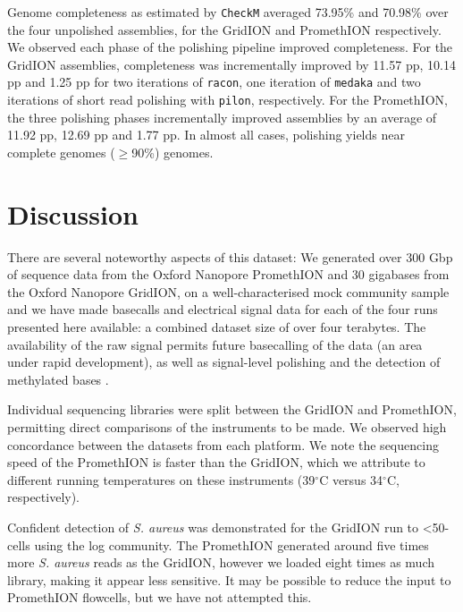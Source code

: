 \documentclass[a4paper,num-refs]{oup-contemporary}
\begin{document}
Genome completeness as estimated by \texttt{CheckM} averaged 73.95\% and 70.98\% over the four unpolished assemblies, for the GridION and PromethION respectively.
We observed each phase of the polishing pipeline improved completeness.
For the GridION assemblies, completeness was incrementally improved by 11.57 pp, 10.14 pp and 1.25 pp for two iterations of \texttt{racon}, one iteration of \texttt{medaka} and two iterations of short read polishing with \texttt{pilon}, respectively.
For the PromethION, the three polishing phases incrementally improved assemblies by an average of 11.92 pp, 12.69 pp and 1.77 pp.
In almost all cases, polishing yields near complete genomes ($\geq$90\%) genomes.








\section{Discussion}

There are several noteworthy aspects of this dataset: We generated over 300 Gbp of sequence data from the Oxford Nanopore PromethION and 30 gigabases from the Oxford Nanopore GridION, on a well-characterised mock community sample and we have made basecalls and electrical signal data for each of the four runs presented here available: a combined dataset size of over four terabytes. The availability of the raw signal permits future basecalling of the data (an area under rapid development), as well as signal-level polishing and the detection of methylated bases \cite{Simpson2017-gn}.

Individual sequencing libraries were split between the GridION and PromethION, permitting direct comparisons of the instruments to be made. We observed high concordance between the datasets from each platform. We note the sequencing speed of the PromethION is faster than the GridION, which we attribute to different running temperatures on these instruments (39$^{\circ}$C versus 34$^{\circ}$C, respectively).

Confident detection of \textit{S. aureus} was demonstrated for the  GridION run to <50-cells using the log community.
The PromethION generated around five times more \textit{S. aureus} reads as the GridION, however we loaded eight times as much library, making it appear less sensitive.
It may be possible to reduce the input to PromethION flowcells, but we have not attempted this.
\end{document}
